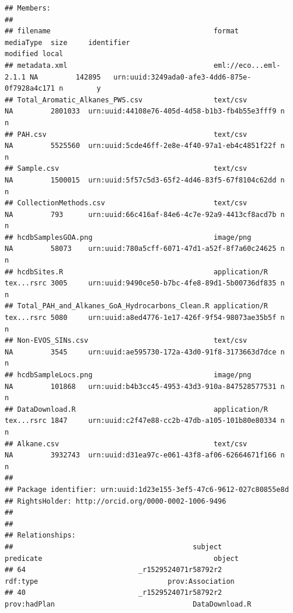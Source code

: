 \documentclass[]{article}
\begin{document}
\begin{verbatim}
## Members:
## 
## filename                                       format                mediaType  size     identifier                                    modified local 
## metadata.xml                                   eml://eco...eml-2.1.1 NA         142895   urn:uuid:3249ada0-afe3-4dd6-875e-0f7928a4c171 n        y     
## Total_Aromatic_Alkanes_PWS.csv                 text/csv              NA         2801033  urn:uuid:44108e76-405d-4d58-b1b3-fb4b55e3fff9 n        n     
## PAH.csv                                        text/csv              NA         5525560  urn:uuid:5cde46ff-2e8e-4f40-97a1-eb4c4851f22f n        n     
## Sample.csv                                     text/csv              NA         1500015  urn:uuid:5f57c5d3-65f2-4d46-83f5-67f8104c62dd n        n     
## CollectionMethods.csv                          text/csv              NA         793      urn:uuid:66c416af-84e6-4c7e-92a9-4413cf8acd7b n        n     
## hcdbSamplesGOA.png                             image/png             NA         58073    urn:uuid:780a5cff-6071-47d1-a52f-8f7a60c24625 n        n     
## hcdbSites.R                                    application/R         tex...rsrc 3005     urn:uuid:9490ce50-b7bc-4fe8-89d1-5b00736df835 n        n     
## Total_PAH_and_Alkanes_GoA_Hydrocarbons_Clean.R application/R         tex...rsrc 5080     urn:uuid:a8ed4776-1e17-426f-9f54-98073ae35b5f n        n     
## Non-EVOS_SINs.csv                              text/csv              NA         3545     urn:uuid:ae595730-172a-43d0-91f8-3173663d7dce n        n     
## hcdbSampleLocs.png                             image/png             NA         101868   urn:uuid:b4b3cc45-4953-43d3-910a-847528577531 n        n     
## DataDownload.R                                 application/R         tex...rsrc 1847     urn:uuid:c2f47e88-cc2b-47db-a105-101b80e80334 n        n     
## Alkane.csv                                     text/csv              NA         3932743  urn:uuid:d31ea97c-e061-43f8-af06-62664671f166 n        n     
## 
## Package identifier: urn:uuid:1d23e155-3ef5-47c6-9612-027c80855e8d
## RightsHolder: http://orcid.org/0000-0002-1006-9496
## 
## 
## Relationships:
##                                           subject                 predicate                                         object
## 64                           _r1529524071r58792r2                  rdf:type                               prov:Association
## 40                           _r1529524071r58792r2              prov:hadPlan                                 DataDownload.R

\end{verbatim}
\end{document}
